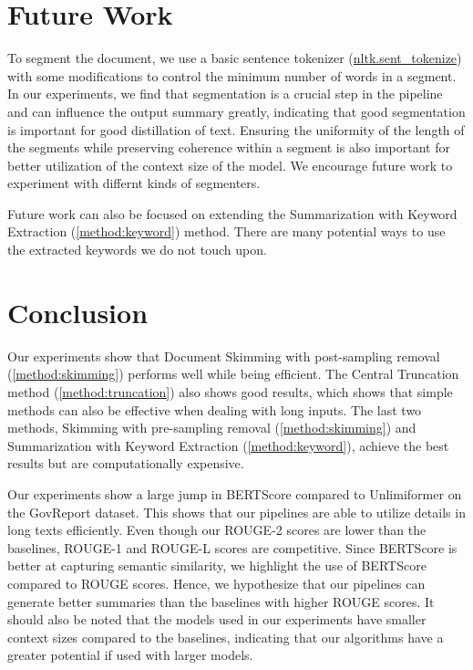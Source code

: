 \section{Future Work}
	\label{sec:future-work}

	To segment the document, we use a basic sentence tokenizer
	(\href{https://www.nltk.org/api/nltk.tokenize.sent_tokenize.html}{nltk.sent\_tokenize})
	with some modifications to control the minimum number of words in a segment.
	In our experiments, we find that segmentation is a crucial step in the pipeline and can influence
	the output summary greatly, indicating that good segmentation is important for good distillation
	of text.
	Ensuring the uniformity of the length of the segments while preserving coherence within a
	segment is also important for better utilization of the context size of the model.
	We encourage future work to experiment with differnt kinds of segmenters.

	Future work can also be focused on extending the Summarization with Keyword Extraction
	(\ref{method:keyword}) method.
	There are many potential ways to use the extracted keywords we do not touch upon.


\section{Conclusion}
\label{sec:conclusion}

	Our experiments show that Document Skimming with post-sampling removal (\ref{method:skimming})
	performs well while being efficient.
	The Central Truncation method (\ref{method:truncation}) also shows good results, which
	shows that simple methods can also be effective when dealing with long inputs.
	The last two methods, Skimming with pre-sampling removal (\ref{method:skimming}) and Summarization
	with Keyword Extraction (\ref{method:keyword}), achieve the best results but are computationally
	expensive.

	Our experiments show a large jump in BERTScore compared to Unlimiformer
	\cite{bertsch2023unlimiformer} on the GovReport dataset.
	This shows that our pipelines are able to utilize details in long texts efficiently.
	Even though our ROUGE-2 scores are lower than the baselines, ROUGE-1 and ROUGE-L scores are
	competitive.
	Since BERTScore is better at capturing semantic similarity, we highlight the use of BERTScore
	compared to ROUGE scores.
	Hence, we hypothesize that our pipelines can generate better summaries than the baselines
	with higher ROUGE scores.
	It should also be noted that the models used in our experiments have smaller context sizes compared
	to the baselines, indicating that our algorithms have a greater potential if used with larger models.


